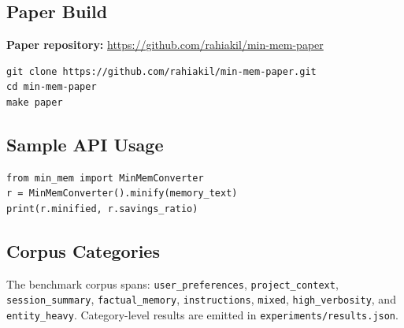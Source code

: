 \documentclass[10pt,twocolumn]{article}
\begin{document}
\subsection{Paper Build}

\textbf{Paper repository:} \url{https://github.com/rahiakil/min-mem-paper}

\begin{verbatim}
git clone https://github.com/rahiakil/min-mem-paper.git
cd min-mem-paper
make paper
\end{verbatim}

\subsection{Sample API Usage}

\begin{verbatim}
from min_mem import MinMemConverter
r = MinMemConverter().minify(memory_text)
print(r.minified, r.savings_ratio)
\end{verbatim}

\subsection{Corpus Categories}

The benchmark corpus spans: \texttt{user\_preferences}, \texttt{project\_context}, \texttt{session\_summary}, \texttt{factual\_memory}, \texttt{instructions}, \texttt{mixed}, \texttt{high\_verbosity}, and \texttt{entity\_heavy}. Category-level results are emitted in \texttt{experiments/results.json}.
\end{document}

